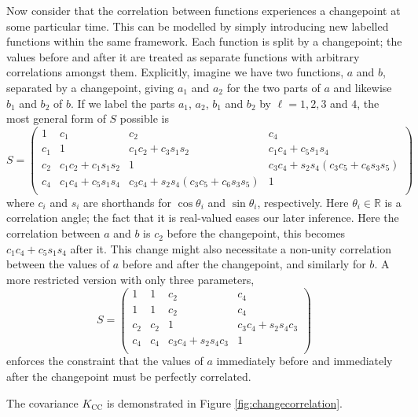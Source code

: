 \documentclass{article}
\newcommand{\R}{\mathbb{R}}
\begin{document}
Now consider that the correlation between functions experiences a changepoint at some particular time. This can be modelled by simply introducing new labelled functions within the same framework. Each function is split by a changepoint; the values before and after it are treated as separate functions with arbitrary correlations amongst them. Explicitly, imagine we have two functions, $a$ and $b$, separated by a changepoint, giving $a_1$ and $a_2$ for the two parts of $a$ and likewise $b_1$ and $b_2$ of $b$. If we label the parts $a_1$, $a_2$, $b_1$ and $b_2$ by $\ell = 1,2,3$ and $4$, the most general form of $S$ possible is
$$
S = \begin{pmatrix}
1 & c_1 & c_2 & c_4 \\
c_1 & 1 & c_1 c_2+c_3 s_1 s_2 & c_1 c_4 + c_5 s_1 s_4 \\
c_2 & c_1 c_2 + c_1 s_1 s_2 & 1 & c_3 c_4 + s_2 s_4 (c_3 c_5 + c_6 s_3 s_5) \\
c_4 & c_1 c_4 + c_5 s_1 s_4 & c_3 c_4 + s_2 s_4 (c_3 c_5 + c_6 s_3 s_5) & 1 \\
\end{pmatrix}
$$
where $c_i$ and $s_i$ are shorthands for $\cos \theta_i$ and $\sin \theta_i$, respectively. Here $\theta_i\in \R$ is a correlation angle; the fact that it is real-valued eases our later inference. Here the correlation between $a$ and $b$ is $c_2$ before the changepoint, this becomes $c_1 c_4 + c_5 s_1 s_4$ after it. This change might also necessitate  a non-unity correlation between the values of $a$ before and after the changepoint, and similarly for $b$. A more restricted version with only three parameters,
$$
S = \begin{pmatrix}
1 & 1 & c_2 & c_4 \\
1 & 1 & c_2 & c_4 \\
c_2 & c_2 & 1 & c_3 c_4 + s_2 s_4 c_3 \\
c_4 & c_4 & c_3 c_4 + s_2 s_4 c_3 & 1 \\
\end{pmatrix}
$$
enforces the constraint that the values of $a$ immediately before and immediately after the changepoint must be perfectly correlated.


The covariance $K_{\text{CC}}$ is demonstrated in Figure
\ref{fig:changecorrelation}.
\end{document}
